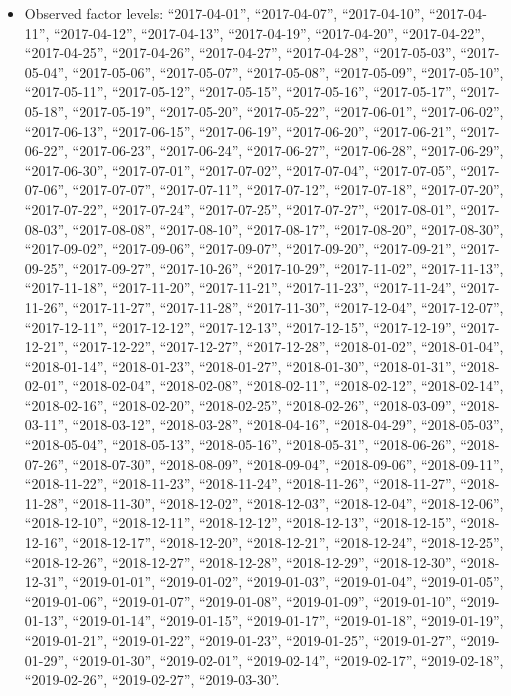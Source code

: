 \documentclass[
  letterpaper,
  DIV=11,
  numbers=noendperiod]{scrartcl}
\providecommand{\tightlist}{%
  \setlength{\itemsep}{0pt}\setlength{\parskip}{0pt}}
\begin{document}
\begin{itemize}
\tightlist
\item
  Observed factor levels: ``2017-04-01'', ``2017-04-07'',
  ``2017-04-10'', ``2017-04-11'', ``2017-04-12'', ``2017-04-13'',
  ``2017-04-19'', ``2017-04-20'', ``2017-04-22'', ``2017-04-25'',
  ``2017-04-26'', ``2017-04-27'', ``2017-04-28'', ``2017-05-03'',
  ``2017-05-04'', ``2017-05-06'', ``2017-05-07'', ``2017-05-08'',
  ``2017-05-09'', ``2017-05-10'', ``2017-05-11'', ``2017-05-12'',
  ``2017-05-15'', ``2017-05-16'', ``2017-05-17'', ``2017-05-18'',
  ``2017-05-19'', ``2017-05-20'', ``2017-05-22'', ``2017-06-01'',
  ``2017-06-02'', ``2017-06-13'', ``2017-06-15'', ``2017-06-19'',
  ``2017-06-20'', ``2017-06-21'', ``2017-06-22'', ``2017-06-23'',
  ``2017-06-24'', ``2017-06-27'', ``2017-06-28'', ``2017-06-29'',
  ``2017-06-30'', ``2017-07-01'', ``2017-07-02'', ``2017-07-04'',
  ``2017-07-05'', ``2017-07-06'', ``2017-07-07'', ``2017-07-11'',
  ``2017-07-12'', ``2017-07-18'', ``2017-07-20'', ``2017-07-22'',
  ``2017-07-24'', ``2017-07-25'', ``2017-07-27'', ``2017-08-01'',
  ``2017-08-03'', ``2017-08-08'', ``2017-08-10'', ``2017-08-17'',
  ``2017-08-20'', ``2017-08-30'', ``2017-09-02'', ``2017-09-06'',
  ``2017-09-07'', ``2017-09-20'', ``2017-09-21'', ``2017-09-25'',
  ``2017-09-27'', ``2017-10-26'', ``2017-10-29'', ``2017-11-02'',
  ``2017-11-13'', ``2017-11-18'', ``2017-11-20'', ``2017-11-21'',
  ``2017-11-23'', ``2017-11-24'', ``2017-11-26'', ``2017-11-27'',
  ``2017-11-28'', ``2017-11-30'', ``2017-12-04'', ``2017-12-07'',
  ``2017-12-11'', ``2017-12-12'', ``2017-12-13'', ``2017-12-15'',
  ``2017-12-19'', ``2017-12-21'', ``2017-12-22'', ``2017-12-27'',
  ``2017-12-28'', ``2018-01-02'', ``2018-01-04'', ``2018-01-14'',
  ``2018-01-23'', ``2018-01-27'', ``2018-01-30'', ``2018-01-31'',
  ``2018-02-01'', ``2018-02-04'', ``2018-02-08'', ``2018-02-11'',
  ``2018-02-12'', ``2018-02-14'', ``2018-02-16'', ``2018-02-20'',
  ``2018-02-25'', ``2018-02-26'', ``2018-03-09'', ``2018-03-11'',
  ``2018-03-12'', ``2018-03-28'', ``2018-04-16'', ``2018-04-29'',
  ``2018-05-03'', ``2018-05-04'', ``2018-05-13'', ``2018-05-16'',
  ``2018-05-31'', ``2018-06-26'', ``2018-07-26'', ``2018-07-30'',
  ``2018-08-09'', ``2018-09-04'', ``2018-09-06'', ``2018-09-11'',
  ``2018-11-22'', ``2018-11-23'', ``2018-11-24'', ``2018-11-26'',
  ``2018-11-27'', ``2018-11-28'', ``2018-11-30'', ``2018-12-02'',
  ``2018-12-03'', ``2018-12-04'', ``2018-12-06'', ``2018-12-10'',
  ``2018-12-11'', ``2018-12-12'', ``2018-12-13'', ``2018-12-15'',
  ``2018-12-16'', ``2018-12-17'', ``2018-12-20'', ``2018-12-21'',
  ``2018-12-24'', ``2018-12-25'', ``2018-12-26'', ``2018-12-27'',
  ``2018-12-28'', ``2018-12-29'', ``2018-12-30'', ``2018-12-31'',
  ``2019-01-01'', ``2019-01-02'', ``2019-01-03'', ``2019-01-04'',
  ``2019-01-05'', ``2019-01-06'', ``2019-01-07'', ``2019-01-08'',
  ``2019-01-09'', ``2019-01-10'', ``2019-01-13'', ``2019-01-14'',
  ``2019-01-15'', ``2019-01-17'', ``2019-01-18'', ``2019-01-19'',
  ``2019-01-21'', ``2019-01-22'', ``2019-01-23'', ``2019-01-25'',
  ``2019-01-27'', ``2019-01-29'', ``2019-01-30'', ``2019-02-01'',
  ``2019-02-14'', ``2019-02-17'', ``2019-02-18'', ``2019-02-26'',
  ``2019-02-27'', ``2019-03-30''.
\end{itemize}
\end{document}
